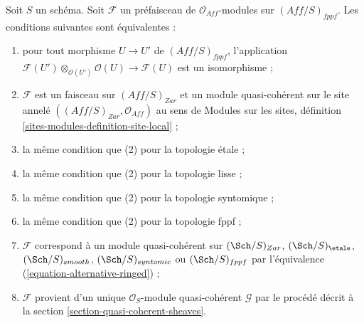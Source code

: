 \begin{lemma}
\label{lemma-quasi-coherent-alternative}
Soit $S$ un schéma. Soit $\mathcal{F}$ un préfaisceau de
$\mathcal{O}_{\textit{Aff}}$-modules sur $(\textit{Aff}/S)_{fppf}$.
Les conditions suivantes sont équivalentes :
\begin{enumerate}
\item pour tout morphisme $U \to U'$ de $(\textit{Aff}/S)_{fppf}$,
l'application
$\mathcal{F}(U') \otimes_{\mathcal{O}(U')} \mathcal{O}(U) \to \mathcal{F}(U)$
est un isomorphisme ;
\item $\mathcal{F}$ est un faisceau sur $(\textit{Aff}/S)_{Zar}$ et un
module quasi-cohérent sur le site annelé
$((\textit{Aff}/S)_{Zar}, \mathcal{O}_{\textit{Aff}})$ au sens de Modules
sur les sites, définition \ref{sites-modules-definition-site-local} ;
\item la même condition que (2) pour la topologie \'etale ;
\item la même condition que (2) pour la topologie lisse ;
\item la même condition que (2) pour la topologie syntomique ;
\item la même condition que (2) pour la topologie fppf ;
\item $\mathcal{F}$ correspond à un module quasi-cohérent sur
$(\Sch/S)_{Zar}$,
$(\Sch/S)_\etale$,
$(\Sch/S)_{smooth}$,
$(\Sch/S)_{syntomic}$ ou
$(\Sch/S)_{fppf}$ par l'équivalence
(\ref{equation-alternative-ringed}) ;
\item $\mathcal{F}$ provient d'un unique $\mathcal{O}_S$-module
quasi-cohérent $\mathcal{G}$ par le procédé décrit à la section
\ref{section-quasi-coherent-sheaves}.
\end{enumerate}
\end{lemma}

